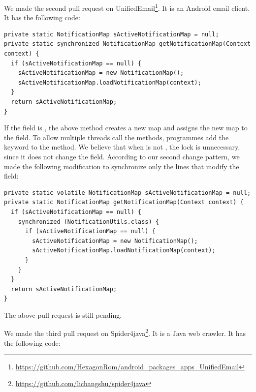 
We made the second pull request on UnifiedEmail\footnote{\url{https://github.com/HexagonRom/android_packages_apps_UnifiedEmail}}. It is an Android email client. It has the following code:

\begin{lstlisting}
private static NotificationMap sActiveNotificationMap = null;
private static synchronized NotificationMap getNotificationMap(Context context) {
  if (sActiveNotificationMap == null) {
    sActiveNotificationMap = new NotificationMap();
    sActiveNotificationMap.loadNotificationMap(context);
  }
  return sActiveNotificationMap;
}
\end{lstlisting}

If the  field is , the above method creates a new map and assigns the new map to the field. To allow multiple threads call the methods, programmes add the  keyword to the method. We believe that when  is not , the lock is unnecessary, since it does not change the field. According to our second change pattern, we made the following modification to synchronize only the lines that modify the field:

\begin{lstlisting}
private static volatile NotificationMap sActiveNotificationMap = null;
private static NotificationMap getNotificationMap(Context context) {
  if (sActiveNotificationMap == null) {
    synchronized (NotificationUtils.class) {
      if (sActiveNotificationMap == null) {
        sActiveNotificationMap = new NotificationMap();
        sActiveNotificationMap.loadNotificationMap(context);
      }
    }
  }
  return sActiveNotificationMap;
}
\end{lstlisting}

The above pull request is still pending.

We made the third pull request on Spider4java\footnote{\url{https://github.com/lichangshu/spider4java}}. It is a Java web crawler. It has the following code:

